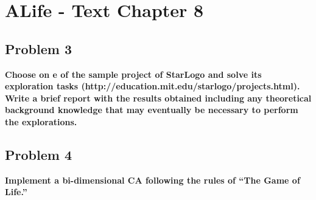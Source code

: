 
\chapter{ALife - Text Chapter 8}

\section{ Problem 3 }
\textbf{ Choose on e of the sample project of StarLogo and solve its exploration tasks (http://education.mit.edu/starlogo/projects.html). Write a brief report with the results obtained including any theoretical background knowledge that may eventually be necessary to perform the explorations. } 

\section{ Problem 4 }
\textbf{ Implement a bi-dimensional CA following the rules of ``The Game of Life.'' }
